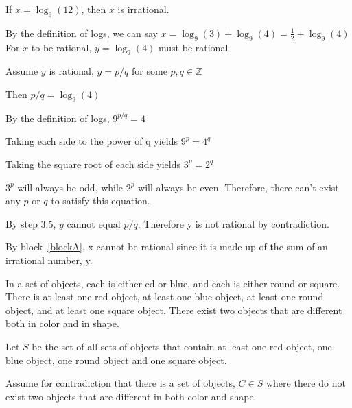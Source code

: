 \documentclass[11pt]{article}
\begin{document}
\begin{problems}


\problem

\begin{theorem}[Problem 1]
  If $x = \log_9(12)$, then $x$ is irrational.
\end{theorem}
\begin{longFormProof}
  \step By the definition of logs, we can say $x = \log_9(3) + \log_9(4) = \frac{1}{2} + \log_9(4)$
  \step For $x$ to be rational, $y = \log_9(4)$ must be rational
  \begin{block}[blockA]
    {Assume $y$ is rational, $y=p/q$ for some $p, q \in \mathbb{Z}$}
    
    \step Then $p/q = \log_9(4)$

    \step By the definition of logs, $9^{p/q} = 4$

    \step Taking each side to the power of q yields $9^p = 4^q$

    \step Taking the square root of each side yields $3^p = 2^q$

    \step $3^p$ will always be odd, while $2^p$ will always be even. Therefore, there can't exist any $p$ or $q$ to satisfy this equation.

    \step By step 3.5, $y$ cannot equal $p/q$. Therefore y is not rational by contradiction.
  \end{block}

  \step By block~\ref{blockA}, x cannot be rational since it is made up of the sum of an irrational number, y.
\end{longFormProof}


\problem

\begin{theorem}[Problem 4]
  In a set of objects, each is either ed or blue, and each is either round or square. There is at least one red object, at least one blue object, at least one round object, and at least one square object. There exist two objects that are different both in color and in shape.
\end{theorem}
\begin{longFormProof}
  \step Let $S$ be the set of all sets of objects that contain at least one red object, one blue object, one round object and one square object.
  \begin{block}[blockB]
    {Assume for contradiction that there is a set of objects, $C \in S$ where there do not exist two objects that are different in both color and shape.}
    

\end{block}
\end{longFormProof}
\end{problems}
\end{document}
